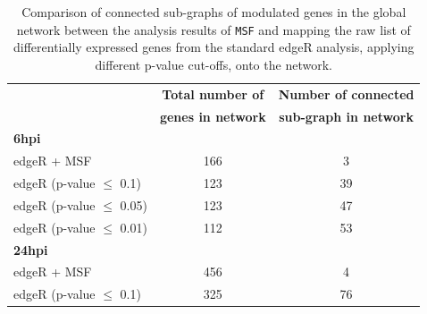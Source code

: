 \documentclass[10pt,a4paper,twocolumn]{article}
\begin{document}
\begin{table}[]
	\centering
	\caption{Comparison of connected sub-graphs of modulated genes
          in the global network between the analysis results of
          \texttt{MSF} and mapping the raw list of differentially
          expressed genes from the standard edgeR analysis, applying
          different p-value cut-offs, onto the network. }
	\label{tab:rawVsHartung}
	\begin{tabular}{lll}
		\hline
		\multicolumn{1}{|l|}{}                            & \multicolumn{1}{c|}{\textbf{Total number of}}       & \multicolumn{1}{c|}{\textbf{Number of connected}}      \\
                \multicolumn{1}{|l|}{}                            & \multicolumn{1}{c|}{\textbf{genes in network}}      & \multicolumn{1}{c|}{\textbf{sub-graph in network}}     \\ \hline
		\multicolumn{1}{|l|}{\textbf{6hpi}}               & \multicolumn{1}{l|}{}                                                & \multicolumn{1}{c|}{}                 \\ \hline
		\multicolumn{1}{|l|}{edgeR + MSF}                 & \multicolumn{1}{c|}{166}                                             & \multicolumn{1}{c|}{3}                \\ \hline
		\multicolumn{1}{|l|}{edgeR (p-value $\leq$ 0.1)}  & \multicolumn{1}{c|}{123}                                             & \multicolumn{1}{c|}{39}               \\ \hline
		\multicolumn{1}{|l|}{edgeR (p-value $\leq$ 0.05)} & \multicolumn{1}{c|}{123}                                             & \multicolumn{1}{c|}{47}               \\ \hline
		\multicolumn{1}{|l|}{edgeR (p-value $\leq$ 0.01)} & \multicolumn{1}{c|}{112}                                             & \multicolumn{1}{c|}{53}               \\ \hline
		\multicolumn{1}{|l|}{\textbf{24hpi}}              & \multicolumn{1}{c|}{}                                                & \multicolumn{1}{c|}{}                 \\ \hline
		\multicolumn{1}{|l|}{edgeR + MSF}                 & \multicolumn{1}{c|}{456}                                             & \multicolumn{1}{c|}{4}                \\ \hline
		\multicolumn{1}{|l|}{edgeR (p-value $\leq$ 0.1)}  & \multicolumn{1}{c|}{325}                                             & \multicolumn{1}{c|}{76}               \\ \hline

\end{tabular}
\end{table}
\end{document}
